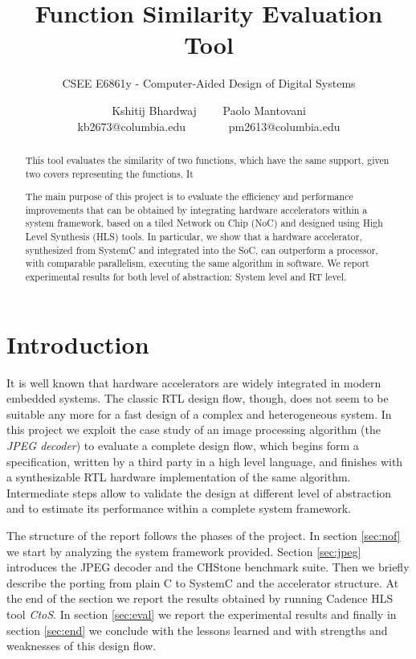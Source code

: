 \documentclass{acm_proc_article-sp}
\begin{document}
\title{Function Similarity Evaluation Tool}
\subtitle{CSEE E6861y - Computer-Aided Design of Digital Systems}

\author{
\alignauthor
Kshitij Bhardwaj \ \ \ \ Paolo Mantovani\\
{\small kb2673@columbia.edu \ \ \ \ \ \ \ pm2613@columbia.edu}
}

\maketitle

\begin{abstract}
This tool evaluates the similarity of two functions, which have the same support,
given two covers representing the functions. It

The main purpose of this project is to evaluate the efficiency and
performance improvements that can be obtained by integrating hardware
accelerators within a system framework, based on a tiled Network on Chip (NoC)
and designed using High Level Synthesis (HLS) tools.
In particular, we show that a hardware accelerator, synthesized from
SystemC and integrated into the SoC, can outperform a processor, with comparable
parallelism, executing the same algorithm in software.
We report experimental results for both level of abstraction: System level and
RT level.
\end{abstract}


\section{Introduction}
It is well known that hardware accelerators are widely integrated in modern
embedded systems. The classic RTL design flow, though, does not seem to be
suitable any more for a fast design of a complex and heterogeneous system.
In this project we exploit the case study of an image processing algorithm
(the \emph{JPEG decoder}) to evaluate a complete design flow, which begins
form a specification, written by a third party in a high level language, and
finishes with a synthesizable RTL hardware implementation of the same algorithm.
Intermediate steps allow to validate the design at different level of abstraction
and to estimate its performance within a complete system framework.

 
The structure of the report follows the phases of the project.
In section \ref{sec:nof} we start by analyzing the system framework provided.
Section \ref{sec:jpeg} introduces the JPEG decoder and the CHStone \cite{chstone}
benchmark suite. Then we briefly describe the porting from plain C to SystemC and 
the accelerator structure. At the end of the section we report the results obtained
by running Cadence HLS tool \emph{CtoS}.
In section \ref{sec:eval} we report the experimental results and finally in section
\ref{sec:end} we conclude with the lessons learned and with strengths and weaknesses
of this design flow.
\end{document}
